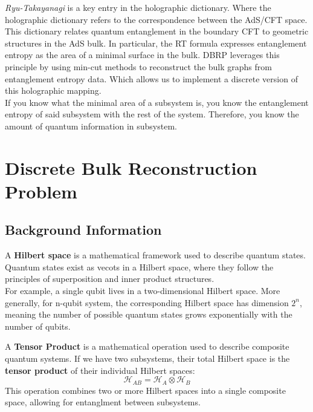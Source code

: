 \documentclass[12pt]{article}
\begin{document}
        \hspace{0.5cm} \textit{Ryu-Takayanagi} is a key entry in the holographic dictionary. Where the holographic dictionary refers to the correspondence between the AdS/CFT space. This dictionary relates quantum entanglement in the boundary CFT to geometric structures in the AdS bulk. In particular, the RT formula expresses entanglement entropy as the area of a minimal surface in the bulk. DBRP leverages this principle by using min-cut methods to reconstruct the bulk graphs from entanglement entropy data. Which allows us to implement a discrete version of this holographic mapping.
        \\

        \hspace{0.5cm} If you know what the minimal area of a subsystem is, you know the entanglement entropy of said subsystem with the rest of the system. Therefore, you know the amount of quantum information in subsystem.

\section{Discrete Bulk Reconstruction Problem}
\subsection{Background Information}
    \hspace{0.5cm}A \textbf{Hilbert space} is a mathematical framework used to describe quantum states. Quantum states exist as vecots in a Hilbert space, where they follow the principles of superposition and inner product structures.
    \\
    For example, a single qubit lives in a two-dimensional Hilbert space. More generally, for n-qubit system, the corresponding Hilbert space has dimension $2^n$, meaning the number of possible quantum states grows exponentially with the number of qubits.
    
    \vspace{0.3cm}

    \indent A \textbf{Tensor Product} is a mathematical operation used to describe composite quantum systems. If we have two subsystems, their total Hilbert space is the \textbf{tensor product} of their individual Hilbert spaces: 
    \[
        \mathcal{H}_{AB} = \mathcal{H}_{A} \otimes \mathcal{H}_B
    \]
    This operation combines two or more Hilbert spaces into a single composite space, allowing for entanglment between subsystems. 
\end{document}
